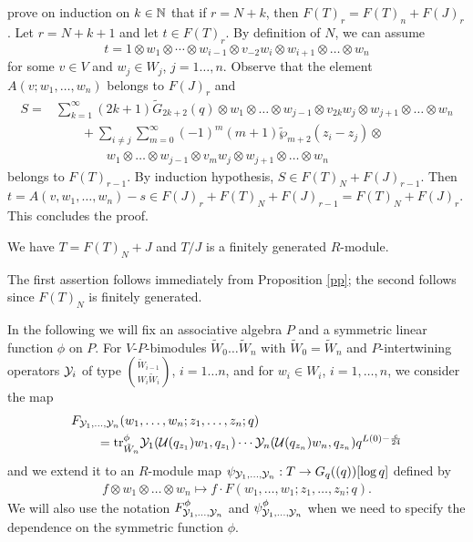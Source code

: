 \documentclass[12pt]{article}
\begin{document}
  prove on induction on $k\in \mathbb{N}$ that if $r = N+k$, then
  $F(T)_r = F(T)_n + F(J)_r$.
  Let $r = N + k + 1$ and let $t \in F(T)_r$. By definition of $N$, we can assume
  $$
    t = 1\otimes w_1\otimes\cdots \otimes
    w_{i-1}\otimes v_{-2}w_i\otimes w_{i+1}\otimes \ldots \otimes w_n
  $$
  for some $v\in V$ and $w_j \in W_j$, $j=1\ldots, n$. Observe that
  the element $A(v; w_1,\ldots, w_n)$ belongs to $F(J)_r$ and
  \begin{align*}
    S = &\sum_{k=1}^\infty (2k+1)\tilde G_{2k+2}(q)\otimes
      w_1\otimes\ldots\otimes w_{j-1}\otimes v_{2k}w_j\otimes
      w_{j+1}\otimes\ldots\otimes w_n\\
    &\qquad + \sum_{i\neq j}\sum_{m=0}^\infty (-1)^m(m+1)
      \tilde \wp_{m+2}(z_i - z_j)\otimes\\
    &\qquad \qquad w_1\otimes\ldots\otimes w_{j-1}\otimes v_{m}w_j\otimes
      w_{j+1}\otimes\ldots\otimes w_n
  \end{align*}
  belongs to $F(T)_{r-1}$. By induction hypothesis, $S\in F(T)_N + F(J)_{r-1}$.
  Then $t = A(v,w_1,\ldots, w_n) - s \in F(J)_{r} + F(T)_N + F(J)_{r-1} =
    F(T)_N + F(J)_r$.
  This concludes the proof.
\epfv
\begin{cor}
  We have $T = F(T)_N + J$ and $T/J$ is a finitely generated $R$-module.
\end{cor}

\proof
  The first assertion follows immediately from Proposition \ref{pp}; the second
  follows since $F(T)_N$ is finitely generated.
\epfv

In the following we will fix an associative algebra $P$ and a symmetric linear
function $\phi$ on $P$.
For $V$-$P$-bimodules $\tilde W_0\ldots \tilde W_n$ with $\tilde W_0 = \tilde W_n$
and $P$-intertwining operators $\mathcal{Y}_i$ of type $\binom{\tilde W_{i-1}}{W_i \tilde W_i}$,
$i=1\ldots n$, and for $w_i\in W_i$, $i=1,\ldots,n$, we consider the map
\begin{align*}
  &F_{\mathcal{Y}_1,\ldots,\mathcal{Y}_n}(w_1,\ldots,w_n; z_1, \ldots, z_n; q)\\
  &\qquad =\mbox{\rm tr}^\phi_{\tilde W_n} \mathcal{Y}_{1}(\mathcal{U}(q_{z_{1}})w_{1}, q_{z_{1}})\cdots \mathcal{Y}_{n}(\mathcal{U}(q_{z_{n}})w_{n}, q_{z_{n}})q^{L(0) - \frac{c}{24}}
\end{align*}
and we extend it to an $R$-module map
$\psi_{\mathcal{Y}_1,\ldots,\mathcal{Y}_n} : T \rightarrow G_q((q))[\log q]$ defined by
\begin{align*}
  f\otimes w_1\otimes \ldots \otimes w_n \mapsto
  f\cdot F(w_1,\ldots, w_1; z_1,\ldots,z_n;q).
\end{align*}
We will also use the notation
$F^\phi_{\mathcal{Y}_1,\ldots,\mathcal{Y}_n}$
and
$\psi^\phi_{\mathcal{Y}_1,\ldots,\mathcal{Y}_n}$
when we need to specify the dependence on the symmetric function $\phi$.
\end{document}
